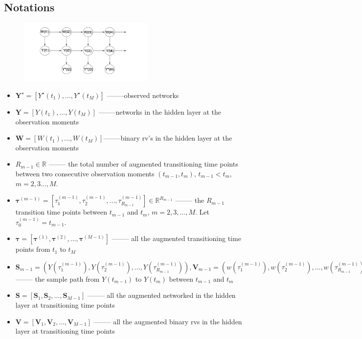 \documentclass[10pt,letterpaper]{article}
\numberwithin{table}{section}
\numberwithin{figure}{section}
\numberwithin{equation}{section}
\begin{document}
\subsection{Notations}
\begin{figure}[H]
\centering
\includegraphics[width=0.6\textwidth]{figures/graphical_rep.png}
\end{figure}
\begin{itemize}
\item 
$\bm Y^\star = [Y^\star(t_1),...,Y^\star(t_M)]$ --------observed networks
\item 
$\bm Y = [Y(t_1),...,Y(t_M)] $ --------networks in the hidden layer at the observation moments
\item 
$\bm W = [W(t_1),...,W(t_M)] $--------binary rv's in the hidden layer at the observation moments
\item 
$R_{m-1}\in \mathbb{R}$ -------- the total number of augmented transitioning time points between two consecutive observation moments $(t_{m-1},t_{m})$, $t_{m-1}<t_{m}$, $m=2,3...,M$. 
\item 
$\bm \tau^{(m-1)} = [\tau_1^{(m-1)},\tau_2^{(m-1)}, ..., \tau_{R_{m-1}}^{(m-1)}]\in \mathbb{R}^{R_{m-1}}$
-------- the $R_{m-1}$ transition time points between $t_{m-1}$ and $t_{m}$, $m=2,3,...,M$. Let $\tau^{(m-1)}_0 = t_{m-1}$.
\item 
$\bm \tau  = [\bm \tau^{(1)}, \bm \tau^{(2)},...,\bm \tau^{(M-1)}]$ -------- all the augmented transitioning time points from $t_1$ to $t_M$

\item 
$\bm S_{m-1} = (Y(\tau_1^{(m-1)}), Y(\tau_2^{(m-1)}),...,Y(\tau_{R_{m-1}}^{(m-1)})), \bm V_{m-1} =(w(\tau_1^{(m-1)}), w(\tau_2^{(m-1)}),...,w(\tau_{R_{m-1}}^{(m-1)}))$ -------- the sample path from $Y(t_{m-1})$ to $Y(t_m)$ between $t_{m-1}$ and $t_{m}$

\item 
$\bm S = [\bm S_1,\bm S_2,...,\bm S_{M-1}]$ -------- all the augmented networked in the hidden layer at transitioning time points

\item 
$\bm V = [\bm V_1,\bm V_2,...,\bm V_{M-1}]$ -------- all the augmented binary rvs in the hidden layer at transitioning time points
 
\end{itemize}
\end{document}
